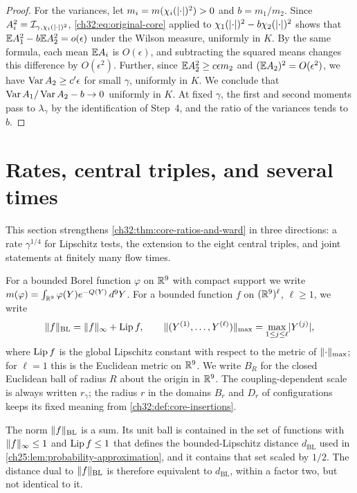 \begin{proof}
For the variances, let $m_i=m(\chi_i(\lvert \cdot\rvert)^2)>0$ and $b=m_1/m_2$. Since $A_i^2=\mathcal I_{\gamma,\chi_i(\lvert \cdot\rvert)^2}$, \eqref{ch32:eq:original-core} applied to $\chi_1(\lvert \cdot\rvert)^2-b\chi_2(\lvert \cdot\rvert)^2$ shows that $\mathbb E A_1^2-b\mathbb E A_2^2=o(\epsilon)$ under the Wilson measure, uniformly in $K$. By the same formula, each mean $\mathbb E A_i$ is $O(\epsilon)$, and subtracting the squared means changes this difference by $O(\epsilon^2)$. Further, since $\mathbb E A_2^2\ge c\epsilon m_2$ and $(\mathbb E A_2)^2=O(\epsilon^2)$, we have $\operatorname{Var} A_2\ge c'\epsilon$ for small $\gamma$, uniformly in $K$. We conclude that $\operatorname{Var} A_1/\operatorname{Var} A_2-b\to0$ uniformly in $K$. At fixed $\gamma$, the first and second moments pass to $\lambda_\gamma$ by the identification of Step~4, and the ratio of the variances tends to $b$.
\end{proof}

\section{Rates, central triples, and several times}\label{ch32:sec:rates}

This section strengthens \cref{ch32:thm:core-ratios-and-ward} in three directions: a rate $\gamma^{1/4}$ for Lipschitz tests, the extension to the eight central triples, and joint statements at finitely many flow times.

\begin{definition}\label{ch32:conv:core-strengthening-notation}
For a bounded Borel function $\varphi$ on $\mathbb R^9$ with compact support we write $m(\varphi)=\int_{\mathbb R^9}\varphi(Y)e^{-Q(Y)}\,d^9Y$. For a bounded function $f$ on $(\mathbb R^9)^\ell$, $\ell\ge1$, we write
\[
 \lVert f\rVert_{\mathrm{BL}}=\lVert f\rVert_\infty+\operatorname{Lip} f,\qquad\lVert (Y^{(1)},\dots,Y^{(\ell)})\rVert_{\max}=\max_{1\le j\le\ell}\lvert Y^{(j)}\rvert,
\]
where $\operatorname{Lip} f$ is the global Lipschitz constant with respect to the metric of $\lVert \cdot\rVert_{\max}$; for $\ell=1$ this is the Euclidean metric on $\mathbb R^9$. We write $B_R$ for the closed Euclidean ball of radius $R$ about the origin in $\mathbb R^9$. The coupling-dependent scale is always written $r_\gamma$; the radius $r$ in the domains $B_r$ and $D_r$ of configurations keeps its fixed meaning from \cref{ch32:def:core-insertions}.
\end{definition}

The norm $\lVert f\rVert_{\mathrm{BL}}$ is a sum. Its unit ball is contained in the set of functions with $\lVert f\rVert_\infty\le1$ and $\operatorname{Lip} f\le1$ that defines the bounded-Lipschitz distance $d_{\mathrm{BL}}$ used in \cref{ch25:lem:probability-approximation}, and it contains that set scaled by $1/2$. The distance dual to $\lVert f\rVert_{\mathrm{BL}}$ is therefore equivalent to $d_{\mathrm{BL}}$, within a factor two, but not identical to it.

